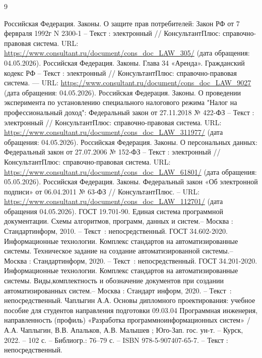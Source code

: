 \renewcommand\UrlFont{\normalfont}
\begin{thebibliography}{9}

     Российская Федерация. Законы. О защите прав потребителей: Закон РФ от 7 фервраля 1992г N 2300-1 -- Текст : электронный // КонсультантПлюс: справочно-правовая система. URL: \url{https://www.consultant.ru/document/cons_doc_LAW_305/} (дата обращения: 04.05.2026).
     Российская Федерация. Законы. Глава 34 «Аренда». Гражданский кодекс РФ -- Текст : электронный // КонсультантПлюс: справочно-правовая система. — URL: \url{https://www.consultant.ru/document/cons_doc_LAW_9027} (дата обращения: 04.05.2026).
     Российская Федерация. Законы. О проведении эксперимента по установлению специального налогового режима "Налог на профессиональный доход": Федеральный закон от 27.11.2018 № 422-ФЗ -- Текст : электронный // КонсультантПлюс: справочно-правовая система. URL: \url{https://www.consultant.ru/document/cons_doc_LAW_311977/} (дата обращения: 04.05.2026).
     Российская Федерация. Законы. О персональных данных: Федеральный закон от 27.07.2006 № 152-ФЗ -- Текст : электронный // КонсультантПлюс: справочно-правовая система. URL: \url{https://www.consultant.ru/document/cons_doc_LAW_61801/} (дата обращения: 05.05.2026).
     Российская Федерация. Законы. Федеральный закон «Об электронной подписи» от 06.04.2011 № 63-ФЗ // КонсультантПлюс. – URL: \url{https://www.consultant.ru/document/cons_doc_LAW_112701/} (дата обращения 04.05.2026).
     ГОСТ 19.701-90. Единая система программной документации. Схемы алгоритмов, программ, данных и систем.– Москва : Стандартинформ, 2010. – Текст~: непосредственный.
     ГОСТ 34.602-2020. Информационные технологии. Комплекс стандартов на автоматизированные системы. Техническое задание на создание автоматизированной системы.– Москва : Стандартинформ, 2020. – Текст~: непосредственный.
     ГОСТ 34.201-2020. Информационные технологии. Комплекс стандартов на автоматизированные системы. Виды,комплектность и обозначение документов при создании автоматизированных систем.– Москва : Стандарт информ, 2020. – Текст~: непосредственный.
     Чаплыгин А.А. Основы дипломного проектирования: учебное пособие для студентов направления подготовки 09.03.04 Программная инженерия, направленность (профиль) «Разработка программноинформационных систем» / А.А. Чаплыгин, В.В. Апальков, А.В. Малышев ; Юго-Зап. гос. ун-т. – Курск, 2022. – 102 с. – Библиогр.: 76–79 с. – ISBN 978-5-907407-65-7. – Текст : непосредственный.

\end{thebibliography}
